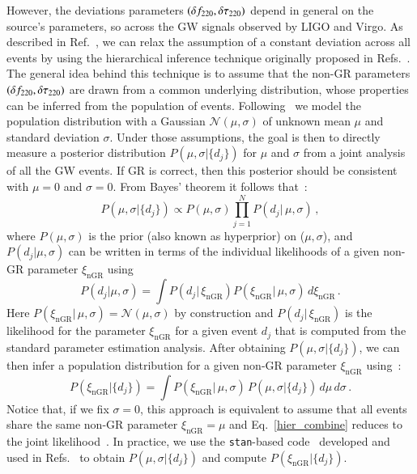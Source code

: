 However,  the deviations parameters $(\delta f_{\text{220}},\delta \tau_{\text{220}})$ depend in general on the source's parameters, so  across the GW signals observed by LIGO and Virgo.
As described in Ref.~\cite{Abbott:2020jks}, we can relax the assumption of a constant deviation across all events by using the hierarchical inference technique originally proposed in Refs.~\cite{Zimmerman:2019wzo,Isi:2019asy}. The general idea behind this technique is to assume that the non-GR parameters $(\delta f_{\text{220}},\delta \tau_{\text{220}})$ are drawn from a common underlying distribution, whose properties can be inferred from the population of events. Following~\cite{Zimmerman:2019wzo,Isi:2019asy,Abbott:2020jks} we model the population distribution with a Gaussian  $\mathcal{N}(\mu,\sigma)$ of unknown mean $\mu$ and standard deviation $\sigma$. Under those assumptions, the goal is then to directly measure a posterior distribution $P(\mu, \sigma |  \{d_j\}) $ for $\mu$ and $\sigma$ from a joint analysis of all the GW events. If GR is correct, then this posterior should be consistent with $\mu=0$ and $\sigma=0$. From Bayes' theorem it follows that~\cite{Isi:2019asy}:
%
\begin{equation}
P(\mu, \sigma |  \{d_j\}) \propto P(\mu,\sigma)\prod _{j=1}^N P(d_j |\, \mu, \sigma) \,,
\end{equation}
%
where $P(\mu,\sigma)$ is the prior (also known as hyperprior) on ($\mu,\sigma$), and $P(d_j | \mu, \sigma) $ can be written in terms of the individual likelihoods of a given non-GR parameter $\xi_{\text{nGR}}$ using~\cite{Isi:2019asy}
%
\begin{equation}
P(d_j | \mu, \sigma) = \int P(d_j |\, \xi_{\text{nGR}})  P(\xi_{\text{nGR}} |\, \mu, \sigma) \,d\xi_{\text{nGR}} \,.
\end{equation}
%
Here $P(\xi_{\text{nGR}} | \,\mu, \sigma) = \mathcal{N}(\mu,\sigma)$ by construction and $P(d_j |\, \xi_{\text{nGR}})$ is the likelihood for the parameter $\xi_{\text{nGR}}$ for a given event $d_j$ that is computed from the standard parameter estimation analysis. After obtaining $P(\mu, \sigma |  \{d_j\})$, we can then infer a population distribution for a given non-GR parameter $\xi_{\text{nGR}}$ using~\cite{Isi:2019asy}:
%
\begin{equation}\label{hier_combine}
P(\xi_{\text{nGR}} | \{d_j\}) = \int P(\xi_{\text{nGR}} |\, \mu, \sigma)\,P(\mu, \sigma |  \{d_j\})\,d\mu\,d\sigma \,.
\end{equation}
%
Notice that, if we fix $\sigma=0$, this approach is equivalent to assume that all events share the same non-GR parameter $\xi_{\text{nGR}} =\mu$ and Eq.~\eqref{hier_combine} reduces to the joint likelihood~\cite{Zimmerman:2019wzo}. In practice, we use the \texttt{stan}-based code~\cite{stan} developed and used in Refs.~\cite{Isi:2019asy,Abbott:2020jks} to obtain $P(\mu, \sigma |  \{d_j\}) $ and compute $P(\xi_{\text{nGR}} | \{d_j\})$.

